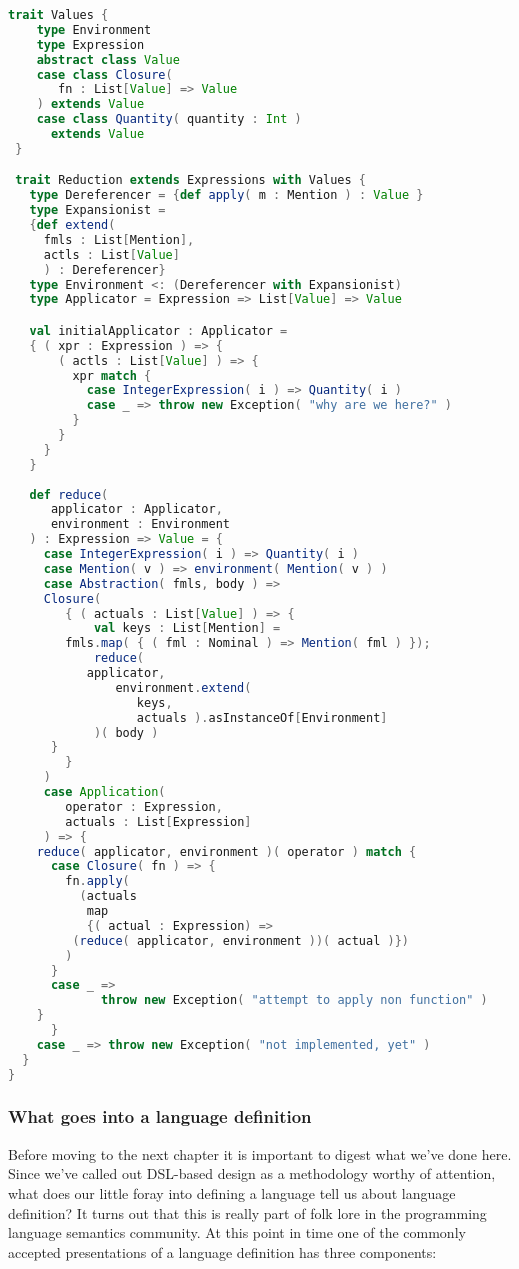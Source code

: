 \begin{lstlisting}[language=Scala]
  trait Values {
    type Environment
    type Expression
    abstract class Value
    case class Closure(
       fn : List[Value] => Value
    ) extends Value
    case class Quantity( quantity : Int )
      extends Value
 }

 trait Reduction extends Expressions with Values {
   type Dereferencer = {def apply( m : Mention ) : Value }
   type Expansionist =
   {def extend(
     fmls : List[Mention],
     actls : List[Value]
     ) : Dereferencer}
   type Environment <: (Dereferencer with Expansionist)
   type Applicator = Expression => List[Value] => Value

   val initialApplicator : Applicator =
   { ( xpr : Expression ) => {
       ( actls : List[Value] ) => {
         xpr match {
           case IntegerExpression( i ) => Quantity( i )
           case _ => throw new Exception( "why are we here?" )
         }
       }
     }
   }
   
   def reduce(
      applicator : Applicator,
      environment : Environment
   ) : Expression => Value = { 
     case IntegerExpression( i ) => Quantity( i )
     case Mention( v ) => environment( Mention( v ) )
     case Abstraction( fmls, body ) =>
     Closure(
        { ( actuals : List[Value] ) => {
            val keys : List[Mention] =
 	    fmls.map( { ( fml : Nominal ) => Mention( fml ) });
            reduce(
	       applicator,
               environment.extend(
                  keys,
                  actuals ).asInstanceOf[Environment]
            )( body )
	  }
        }
     )
     case Application(
        operator : Expression,
        actuals : List[Expression]
     ) => {
	reduce( applicator, environment )( operator ) match {
	  case Closure( fn ) => {
	    fn.apply(
	      (actuals
	       map
	       {( actual : Expression) =>
		 (reduce( applicator, environment ))( actual )})
	    )
	  }
	  case _ =>
             throw new Exception( "attempt to apply non function" )
	}
      }
    case _ => throw new Exception( "not implemented, yet" )
  }
}
\end{lstlisting}

\subsubsection{What goes into a language definition}

Before moving to the next chapter it is important to digest what we've
done here. Since we've called out DSL-based design as a methodology
worthy of attention, what does our little foray into defining a
language tell us about language definition? It turns out that this is
really part of folk lore in the programming language semantics
community. At this point in time one of the commonly accepted
presentations of a language definition has three components:

